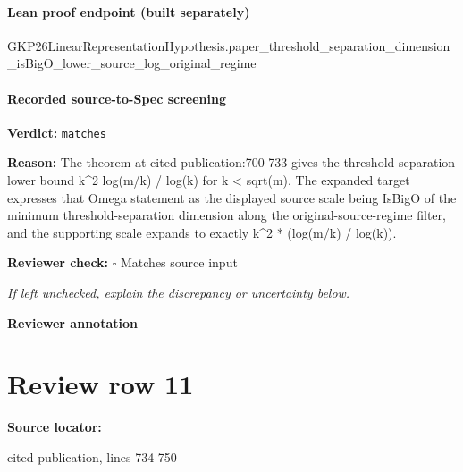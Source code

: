 \documentclass[10pt]{article}
\newcommand{\reviewerbox}{%
  \par\noindent\fbox{\parbox{0.96\linewidth}{\rule{0pt}{0.38in}}}\par
}
\newcommand{\reviewmatch}[1]{%
  \par\noindent\textbf{Reviewer check:} $\square$\; #1\par
  \noindent\emph{If left unchecked, explain the discrepancy or uncertainty below.}\par
}
\begin{document}
\paragraph{Lean proof endpoint (built separately)}\begin{ReviewVerbatim}
GKP26LinearRepresentationHypothesis.paper_threshold_separation_dimension_isBigO_lower_source_log_original_regime
\end{ReviewVerbatim}

\paragraph{Recorded source-to-Spec screening}
\textbf{Verdict:} \texttt{matches}
\\
{\raggedright
\textbf{Reason:} The theorem at cited publication:\allowbreak{}700-\allowbreak{}733 gives the threshold-\allowbreak{}separation lower bound k\textasciicircum{}2 log(m/\allowbreak{}k) /\allowbreak{} log(k) for k < sqrt(m).\allowbreak{} The expanded target expresses that Omega statement as the displayed source scale being IsBigO of the minimum threshold-\allowbreak{}separation dimension along the original-\allowbreak{}source-\allowbreak{}regime filter, and the supporting scale expands to exactly k\textasciicircum{}2 * (log(m/\allowbreak{}k) /\allowbreak{} log(k)).\allowbreak{}
\par}
\reviewmatch{Matches source input}
\noindent\textbf{Reviewer annotation}\par
\reviewerbox
\clearpage
\hypertarget{source-claim-331e1d36e419216b}{}
\section*{Review row 11}
\textbf{Source locator:} {\footnotesize\raggedright cited publication, lines 734-\allowbreak{}750\par}
\end{document}
